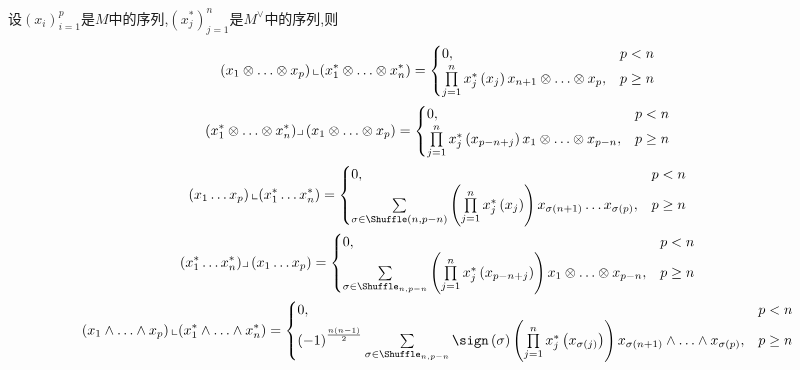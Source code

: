 \begin{theorem}{}{}
	设$\left(x_{i}\right)_{i=1}^{p}$是$M$中的序列,$\left(x_{j}^{\ast}\right)_{j=1}^{n}$是$M^{\vee}$中的序列,则
	\begin{gather*}
		\left(x_{1}\otimes\ldots\otimes x_{p}\right)\llcorner\left(x_{1}^{\ast}\otimes\ldots\otimes x_{n}^{\ast}\right)=
		\begin{cases}
			0,&p<n\\
			\prod\limits_{j=1}^{n}x_{j}^{\ast}\left(x_{j}\right)x_{n+1}\otimes\ldots\otimes x_{p},&p\geq n\\
		\end{cases}\\
		\left(x_{1}^{\ast}\otimes\ldots\otimes x_{n}^{\ast}\right)\lrcorner\left(x_{1}\otimes\ldots\otimes x_{p}\right)=
		\begin{cases}
			0,&p<n\\
			\prod\limits_{j=1}^{n}x_{j}^{\ast}\left(x_{p-n+j}\right)x_{1}\otimes\ldots\otimes x_{p-n},&p\geq n\\
		\end{cases}\\
		\left(x_{1}\ldots x_{p}\right)\llcorner\left(x_{1}^{\ast}\ldots x_{n}^{\ast}\right)=
		\begin{cases}
			0,&p<n\\
			\sum\limits_{\sigma\in\Shuffle\left(n,p-n\right)}\left(\prod\limits_{j=1}^{n}x_{j}^{\ast}\left(x_{j}\right)\right)x_{\sigma\left(n+1\right)}\ldots x_{\sigma\left(p\right)},&p\geq n\\
		\end{cases}\\
		\left(x_{1}^{\ast}\ldots x_{n}^{\ast}\right)\lrcorner\left(x_{1}\ldots x_{p}\right)=
		\begin{cases}
			0,&p<n\\
			\sum\limits_{\sigma\in\Shuffle_{n,p-n}}\left(\prod\limits_{j=1}^{n}x_{j}^{\ast}\left(x_{p-n+j}\right)\right)x_{1}\otimes\ldots\otimes x_{p-n},&p\geq n\\
		\end{cases}\\
		\left(x_{1}\wedge\ldots\wedge x_{p}\right)\llcorner\left(x_{1}^{\ast}\wedge\ldots\wedge x_{n}^{\ast}\right)=
		\begin{cases}
			0,&p<n\\
			\left(-1\right)^{\frac{n\left(n-1\right)}{2}}\sum\limits_{\sigma\in\Shuffle_{n,p-n}}\sign\left(\sigma\right)\left(\prod\limits_{j=1}^{n}x_{j}^{\ast}\left(x_{\sigma\left(j\right)}\right)\right)x_{\sigma\left(n+1\right)}\wedge\ldots\wedge x_{\sigma\left(p\right)},&p\geq n

\end{cases}
\end{gather*}
\end{theorem}
